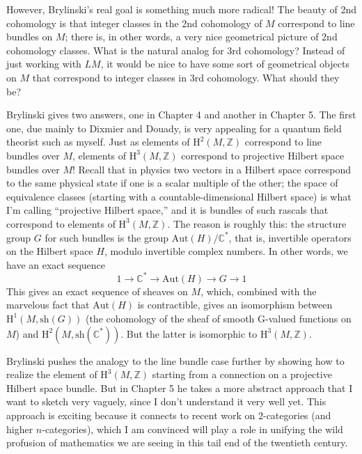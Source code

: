 \documentclass{article}
\begin{document}
However, Brylinski's real goal is something much more radical! The
beauty of 2nd cohomology is that integer classes in the 2nd cohomology
of \(M\) correspond to line bundles on \(M\); there is, in other words,
a very nice geometrical picture of 2nd cohomology classes. What is the
natural analog for 3rd cohomology? Instead of just working with \(LM\),
it would be nice to have some sort of geometrical objects on \(M\) that
correspond to integer classes in 3rd cohomology. What should they be?

Brylinski gives two answers, one in Chapter 4 and another in Chapter 5.
The first one, due mainly to Dixmier and Douady, is very appealing for a
quantum field theorist such as myself. Just as elements of
\(\mathrm{H}^2(M,\mathbb{Z})\) correspond to line bundles over \(M\), elements of
\(\mathrm{H}^3(M,\mathbb{Z})\) correspond to projective Hilbert space bundles
over \(M\)! Recall that in physics two vectors in a Hilbert space
correspond to the same physical state if one is a scalar multiple of the
other; the space of equivalence classes (starting with a
countable-dimensional Hilbert space) is what I'm calling ``projective
Hilbert space,'' and it is bundles of such rascals that correspond to
elements of \(\mathrm{H}^3(M,\mathbb{Z})\). The reason is roughly this: the
structure group \(G\) for such bundles is the group
\(\mathrm{Aut}(H)/\mathbb{C}^*\), that is, invertible operators on the Hilbert
space \(H\), modulo invertible complex numbers. In other words, we have
an exact sequence 
\[1 \to \mathbb{C}^* \to \mathrm{Aut}(H) \to G \to 1\] 
This gives an exact sequence of sheaves on \(M\), which, combined with the
marvelous fact that \(\mathrm{Aut}(H)\) is contractible, gives an isomorphism
between \(\mathrm{H}^1(M,\mathrm{sh}(G))\) (the cohomology of the sheaf of smooth
G-valued functions on \(M\)) and \(\mathrm{H}^2(M,\mathrm{sh}(\mathbb{C}^*))\).
But the latter is isomorphic to \(\mathrm{H}^3(M,\mathbb{Z})\).

Brylinski pushes the analogy to the line bundle case further by showing
how to realize the element of \(\mathrm{H}^3(M,\mathbb{Z})\) starting from a
connection on a projective Hilbert space bundle. But in Chapter 5 he
takes a more abstract approach that I want to sketch very vaguely, since
I don't understand it very well yet. This approach is exciting because
it connects to recent work on \(2\)-categories (and higher
\(n\)-categories), which I am convinced will play a role in unifying the
wild profusion of mathematics we are seeing in this tail end of the
twentieth century.
\end{document}
